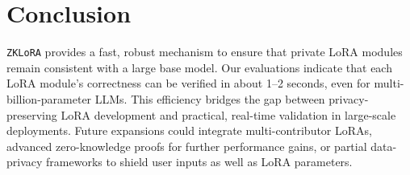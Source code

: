\documentclass[11pt]{article}
\begin{document}
\section{Conclusion}

\texttt{ZKLoRA} provides a fast, robust mechanism to ensure that private LoRA modules remain consistent with a large base model. Our evaluations indicate that each LoRA module’s correctness can be verified in about 1--2 seconds, even for multi-billion-parameter LLMs. This efficiency bridges the gap between privacy-preserving LoRA development and practical, real-time validation in large-scale deployments. Future expansions could integrate multi-contributor LoRAs, advanced zero-knowledge proofs for further performance gains, or partial data-privacy frameworks to shield user inputs as well as LoRA parameters.



\end{document}
